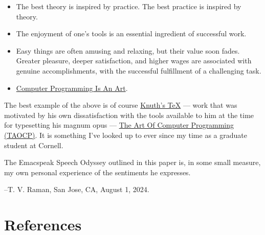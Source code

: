 \documentclass[11pt]{article}
\begin{document}
\begin{itemize}
\item The best theory is inspired by practice. The best practice is
inspired by theory.
\item The enjoyment of one's tools is an essential ingredient of
successful work.
\item Easy things are often amusing and relaxing, but their value soon
fades. Greater pleasure, deeper satisfaction, and higher wages are
associated with genuine accomplishments, with the successful
fulfillment of a challenging task.
\item \href{https://www.azquotes.com/author/8177-Donald\_Knuth}{Computer Programming Is An Art}.
\end{itemize}

The best example of the above is of course \href{https://en.wikipedia.org/wiki/TeX}{Knuth's \TeX{}} --- work that
    was motivated  by his own dissatisfaction with the tools available
    to him at the time for typesetting    his magnum opus --- \href{https://www-cs-faculty.stanford.edu/\~knuth/taocp.html}{The Art
    Of Computer Programming (TAOCP)}.  It is something I've looked up
    to ever since my time as a graduate student at Cornell.


The  Emacspeak Speech Odyssey outlined in this paper is, in some
small measure, my own personal
experience of the sentiments he expresses.

--T. V. Raman,  San Jose, CA, August 1, 2024.
\section{References}
\label{sec:org40f39be}
\end{document}
